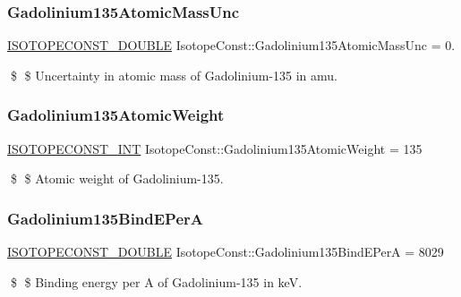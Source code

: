 \subsubsection{\texorpdfstring{Gadolinium135\+Atomic\+Mass\+Unc}{Gadolinium135AtomicMassUnc}}
{\footnotesize\ttfamily \mbox{\hyperlink{group___isotope_const-_macros_ga8f45a7272ce02c0b4c65c44636ed719a}{I\+S\+O\+T\+O\+P\+E\+C\+O\+N\+S\+T\+\_\+\+D\+O\+U\+B\+LE}} Isotope\+Const\+::\+Gadolinium135\+Atomic\+Mass\+Unc = 0.}

\$ \$ Uncertainty in atomic mass of Gadolinium-\/135 in amu. \mbox{\label{group___isotope_const-_gadolinium-_gd135_gab5db702f94e79419a1d3424c0980b66b}} 
\subsubsection{\texorpdfstring{Gadolinium135\+Atomic\+Weight}{Gadolinium135AtomicWeight}}
{\footnotesize\ttfamily \mbox{\hyperlink{group___isotope_const-_macros_ga5f18360b3e99483a35c32d789e62621c}{I\+S\+O\+T\+O\+P\+E\+C\+O\+N\+S\+T\+\_\+\+I\+NT}} Isotope\+Const\+::\+Gadolinium135\+Atomic\+Weight = 135}

\$ \$ Atomic weight of Gadolinium-\/135. \mbox{\label{group___isotope_const-_gadolinium-_gd135_gad5b518f1eabf311c05a1661b331f8206}} 
\subsubsection{\texorpdfstring{Gadolinium135\+Bind\+E\+PerA}{Gadolinium135BindEPerA}}
{\footnotesize\ttfamily \mbox{\hyperlink{group___isotope_const-_macros_ga8f45a7272ce02c0b4c65c44636ed719a}{I\+S\+O\+T\+O\+P\+E\+C\+O\+N\+S\+T\+\_\+\+D\+O\+U\+B\+LE}} Isotope\+Const\+::\+Gadolinium135\+Bind\+E\+PerA = 8029}

\$ \$ Binding energy per A of Gadolinium-\/135 in keV. \mbox{\label{group___isotope_const-_gadolinium-_gd135_gae6a7a3d3e7211f60b136234205143689}} 
